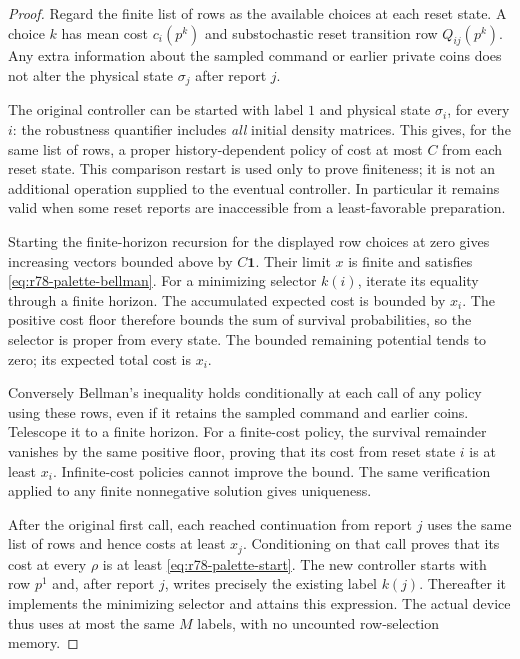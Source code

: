 \begin{proof}
Regard the finite list of rows as the available choices at each reset
state.  A choice $k$ has mean cost $c_i(p^k)$ and substochastic reset
transition row $Q_{ij}(p^k)$.  Any extra information about the sampled
command or earlier private coins does not alter the physical state
$\sigma_j$ after report $j$.

The original controller can be started with label $1$ and physical
state $\sigma_i$, for every $i$: the robustness quantifier includes
\emph{all} initial density matrices.  This gives, for the same list
of rows, a proper history-dependent policy of cost at most $C$ from
each reset state.  This comparison restart is used only to prove
finiteness; it is not an additional operation supplied to the eventual
controller.  In particular it remains valid when some reset reports
are inaccessible from a least-favorable preparation.

Starting the finite-horizon recursion for the displayed row choices
at zero gives increasing vectors bounded above by $C\mathbf1$.
Their limit $x$ is finite and satisfies
\eqref{eq:r78-palette-bellman}.  For a minimizing selector $k(i)$,
iterate its equality through a finite horizon.  The accumulated
expected cost is bounded by $x_i$.  The positive cost floor therefore
bounds the sum of survival probabilities, so the selector is proper
from every state.  The bounded remaining potential tends to zero;
its expected total cost is $x_i$.

Conversely Bellman's inequality holds conditionally at each call of
any policy using these rows, even if it retains the sampled command
and earlier coins.  Telescope it to a finite horizon.  For a
finite-cost policy, the survival remainder vanishes by the same
positive floor, proving that its cost from reset state $i$ is at
least $x_i$.  Infinite-cost policies cannot improve the bound.  The
same verification applied to any finite nonnegative solution gives
uniqueness.

After the original first call, each reached continuation from report
$j$ uses the same list of rows and hence costs at least $x_j$.
Conditioning on that call proves that its cost at every $\rho$ is
at least \eqref{eq:r78-palette-start}.  The new controller starts
with row $p^1$ and, after report $j$, writes precisely the existing
label $k(j)$.  Thereafter it implements the minimizing selector and
attains this expression.  The actual device thus uses at most the
same $M$ labels, with no uncounted row-selection memory.
\end{proof}

